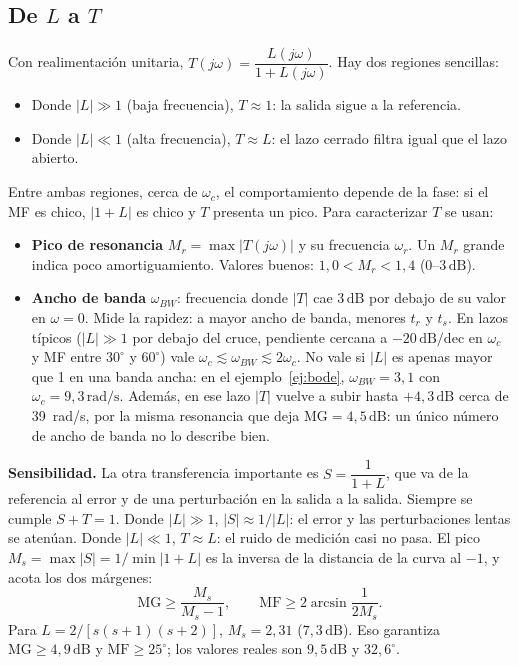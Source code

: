 \documentclass[11pt,a4paper]{article}
\newcounter{ejemplo}
\newcommand{\dB}{\,\mathrm{dB}}
\newcommand{\dBdec}{\,\mathrm{dB/dec}}
\newcommand{\rads}{\,\mathrm{rad/s}}
\newcommand{\jw}{j\omega}
\newcommand{\MF}{\mathrm{MF}}
\newcommand{\MG}{\mathrm{MG}}
\newcommand{\wc}{\omega_c}
\begin{document}
\subsection{De $L$ a $T$}
\label{sec:LaT}
Con realimentación unitaria, $T(\jw)=\dfrac{L(\jw)}{1+L(\jw)}$. Hay dos regiones sencillas:
\begin{itemize}
\item Donde $|L|\gg1$ (baja frecuencia), $T\approx1$: la salida sigue a la referencia.
\item Donde $|L|\ll1$ (alta frecuencia), $T\approx L$: el lazo cerrado filtra igual que el lazo abierto.
\end{itemize}
Entre ambas regiones, cerca de $\wc$, el comportamiento depende de la fase: si el MF es chico, $|1+L|$ es chico y $T$ presenta un pico.
Para caracterizar $T$ se usan:
\begin{itemize}
\item \textbf{Pico de resonancia} $M_r=\max|T(\jw)|$ y su frecuencia $\omega_r$. Un $M_r$ grande indica poco amortiguamiento.
      Valores buenos: $1{,}0<M_r<1{,}4$ ($0$--$3\dB$).
\item \textbf{Ancho de banda} $\omega_{BW}$: frecuencia donde $|T|$ cae $3\dB$ por debajo de su valor en $\omega=0$. Mide la rapidez:
      a mayor ancho de banda, menores $t_r$ y $t_s$. En lazos típicos ($|L|\gg1$ por debajo del cruce, pendiente cercana a $-20\dBdec$ en $\wc$
      y MF entre $30^\circ$ y $60^\circ$) vale $\wc\lesssim\omega_{BW}\lesssim2\wc$. No vale si $|L|$ es apenas mayor que 1 en una banda ancha:
      en el ejemplo~\ref{ej:bode}, $\omega_{BW}=3{,}1$ con $\wc=9{,}3\rads$. Además, en ese lazo $|T|$ vuelve a subir hasta $+4{,}3\dB$ cerca de
      39~rad/s, por la misma resonancia que deja $\MG=4{,}5\dB$: un único número de ancho de banda no lo describe bien.
\end{itemize}

\textbf{Sensibilidad.} La otra transferencia importante es $S=\dfrac{1}{1+L}$, que va de la referencia al error y de una perturbación
en la salida a la salida. Siempre se cumple $S+T=1$. Donde $|L|\gg1$, $|S|\approx1/|L|$: el error y las perturbaciones lentas se
atenúan. Donde $|L|\ll1$, $T\approx L$: el ruido de medición casi no pasa. El pico $M_s=\max|S|=1/\min|1+L|$ es la inversa de la distancia
de la curva al $-1$, y acota los dos márgenes:
\[
\MG\ge\frac{M_s}{M_s-1},\qquad \MF\ge2\arcsin\frac{1}{2M_s}.
\]
Para $L=2/[s(s+1)(s+2)]$, $M_s=2{,}31$ ($7{,}3\dB$). Eso garantiza $\MG\ge4{,}9\dB$ y $\MF\ge25^\circ$; los valores reales son $9{,}5\dB$ y $32{,}6^\circ$.
\end{document}
